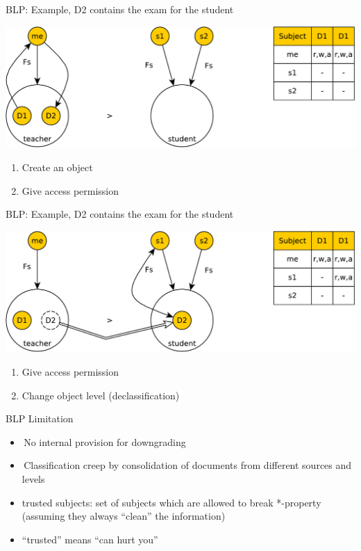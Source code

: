 \documentclass{beamer}
\begin{document}
\begin{frame}[t]{BLP: Example, D2 contains the exam for the student}
  \begin{center}
    \includegraphics[width=0.8\linewidth]{ex11}
  \end{center}
\begin{enumerate}
  \item Create an object
  \item Give access permission
\end{enumerate}
\end{frame}

\begin{frame}[t]{BLP: Example, D2 contains the exam for the student}
  \begin{center}
    \includegraphics[width=0.8\linewidth]{ex12}
  \end{center}
\begin{enumerate}
  \item Give access permission
  \item Change object level (declassification)
\end{enumerate}
\end{frame}

\begin{frame}{BLP Limitation}
  \begin{itemize}
    \item No internal provision for downgrading
    \item Classification creep by consolidation of 
      documents from different sources and levels
    \item \alert{trusted subjects}: set of subjects which are 
      allowed to break *-property (assuming they always 
      ``clean'' the information)
    \item ``trusted''  means ``can hurt you''
  \end{itemize}
\end{frame}
\end{document}
